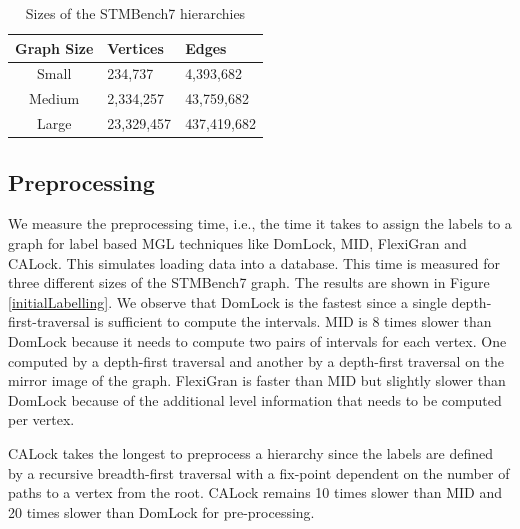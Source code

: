 \begin{table}[h]
	\centering
	\captionsetup{justification=centering}
	\begin{tabular}{c|ll}
		\textbf{Graph Size} & \textbf{Vertices} & \textbf{Edges} \\ \hline
		Small  & 234,737 	& 4,393,682 	\\
		Medium & 2,334,257 	& 43,759,682	\\
		Large  & 23,329,457 & 437,419,682 	\\
	\end{tabular}
	\caption{Sizes of the STMBench7 hierarchies}
	\label{tab:graphSizes}
\end{table}



\subsection{Preprocessing}
We measure the preprocessing time, i.e., the time it takes to assign the labels to a graph for label based MGL techniques like DomLock, MID, FlexiGran and CALock.
This simulates loading data into a database.
This time is measured for three different sizes of the STMBench7 graph. 
The results are shown in Figure \ref{initialLabelling}. 
We observe that DomLock is the fastest since a single depth-first-traversal is sufficient to compute the intervals. MID is 8 times slower than DomLock because it needs to compute two pairs of intervals for each vertex. One computed by a depth-first traversal and another by a depth-first traversal on the mirror image of the graph. FlexiGran is faster than MID but slightly slower than DomLock because of the additional level information that needs to be computed per vertex. 

CALock takes the longest to preprocess a hierarchy since the labels are defined by a recursive breadth-first traversal with a fix-point dependent on the number of paths to a vertex from the root. CALock remains 10 times slower than MID and 20 times slower than DomLock for pre-processing. 

